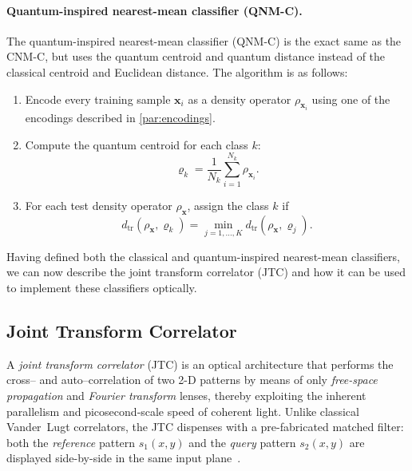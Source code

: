 \documentclass[twocolumn]{article} %
\begin{document}
\paragraph{Quantum-inspired nearest-mean classifier (QNM-C).}
The quantum-inspired nearest-mean classifier (QNM-C) is the exact same as the CNM-C, but uses the quantum centroid and quantum distance instead of the classical centroid and Euclidean distance. The algorithm is as follows:
\begin{enumerate}[leftmargin=*,label=(\alph*)]
    \item Encode every training sample \(\mathbf x_i\) as a density operator
      \(\rho_{\mathbf x_i}\) using one of the encodings described in \ref{par:encodings}.

    \item Compute the quantum centroid for each class \(k\):
        \[
            \varrho_{k}=\frac{1}{N_k}\sum_{i=1}^{N_k}\rho_{\mathbf x_i}.
        \]

    \item For each test density operator \(\rho_{\mathbf x}\), assign the class $k$ if 
        \[
            d_{\operatorname{tr}}(\rho_{\mathbf x},\varrho_{k}) = \min_{j=1,\dots,K} d_{\operatorname{tr}}(\rho_{\mathbf x},\varrho_{j}).
        \]
\end{enumerate}

Having defined both the classical and quantum-inspired nearest-mean classifiers, we can now describe the joint transform correlator (JTC) and how it can be used to implement these classifiers optically.

\subsection{Joint Transform Correlator}
\label{subsec:jtc}
A \emph{joint transform correlator} (JTC) is an optical architecture
that performs the cross– and auto–correlation of two 2-D patterns by
means of only \emph{free-space propagation} and \emph{Fourier
transform} lenses, thereby exploiting the inherent parallelism and
picosecond‐scale speed of coherent light.  Unlike classical
Vander~Lugt correlators, the JTC dispenses with a pre-fabricated
matched filter: both the \emph{reference} pattern \(s_{1}(x,y)\) and
the \emph{query} pattern \(s_{2}(x,y)\) are displayed side-by-side in
the same input plane~\cite{Javidi1989}.
\end{document}
